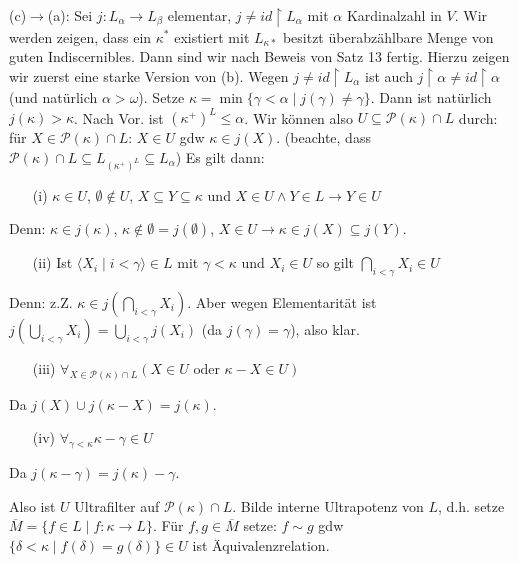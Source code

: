 \documentclass[a4paper,fontsize=11pt]{scrartcl}
\renewcommand{\bar}[1]{\overline{#1}}
\begin{document}
		(c)$\to$(a): Sei $j\colon L_{\alpha}\to L_{\beta}$ elementar, $j\neq id\upharpoonright L_{\alpha}$ mit $\alpha$ Kardinalzahl in $V$.
		Wir werden zeigen, dass ein $\kappa^*$ existiert mit $L_{\kappa*}$ besitzt überabzählbare Menge von guten Indiscernibles.
		Dann sind wir nach Beweis von Satz 13 fertig.
		Hierzu zeigen wir zuerst eine starke Version von (b). 
		Wegen $j\neq id\upharpoonright L_{\alpha}$ ist auch $j\upharpoonright\alpha\neq id\upharpoonright\alpha$ (und natürlich $\alpha>\omega$).
		Setze $\kappa=\min\{\gamma<\alpha\mid j(\gamma)\neq\gamma\}$.
		Dann ist natürlich $j(\kappa)>\kappa$.
		Nach Vor. ist $(\kappa^+)^L\le\alpha$.
		Wir können also $U\subseteq \mathcal P(\kappa)\cap L$ durch:
		für $X\in \mathcal P(\kappa)\cap L$: $X\in U$ gdw $\kappa \in j(X)$.
		(beachte, dass $\mathcal P(\kappa)\cap L\subseteq L_{(\kappa^+)^L}\subseteq L_{\alpha}$)
		Es gilt dann:\begin{itemize}
			\item[(i)] $\kappa\in U$, $\emptyset\not\in U$, $X\subseteq Y\subseteq \kappa$ und $X\in U \land Y\in L\to Y\in U$
		\end{itemize}
		Denn: $\kappa\in j(\kappa)$, $\kappa\not\in\emptyset=j(\emptyset)$, $X\in U\to \kappa\in j(X)\subseteq j(Y)$.
		\begin{itemize}
			\item[(ii)] Ist $\langle X_i\mid i<\gamma\rangle\in L$ mit $\gamma<\kappa$ und $X_i\in U$ so gilt $\bigcap_{i<\gamma} X_i\in U$
		\end{itemize}
		Denn: z.Z. $\kappa\in j(\bigcap_{i<\gamma} X_i)$. 
		Aber wegen Elementarität ist $j(\bigcup_{i<\gamma}X_i)=\bigcup_{i<\gamma}j(X_i)$ (da $j(\gamma)=\gamma$), also klar.
		\begin{itemize}
			\item[(iii)] $\forall_{X\in \mathcal P(\kappa)\cap L} (X\in U \mbox{ oder } \kappa-X\in U)$
		\end{itemize}
		Da $j(X)\cup j(\kappa-X)=j(\kappa)$.
		\begin{itemize}
			\item[(iv)] $\forall_{\gamma<\kappa} \kappa-\gamma\in U$
		\end{itemize}
		Da $j(\kappa-\gamma)=j(\kappa)-\gamma$.
		
		Also ist $U$ Ultrafilter auf $\mathcal P(\kappa)\cap L$.
		Bilde interne Ultrapotenz von $L$, d.h. setze $\bar M=\{ f\in L\mid f\colon\kappa\to L\}$.
		Für $f,g\in \bar M$ setze: $f\sim g$ gdw $\{\delta<\kappa\mid f(\delta)=g(\delta)\}\in U$ ist Äquivalenzrelation.
		
\end{document}
